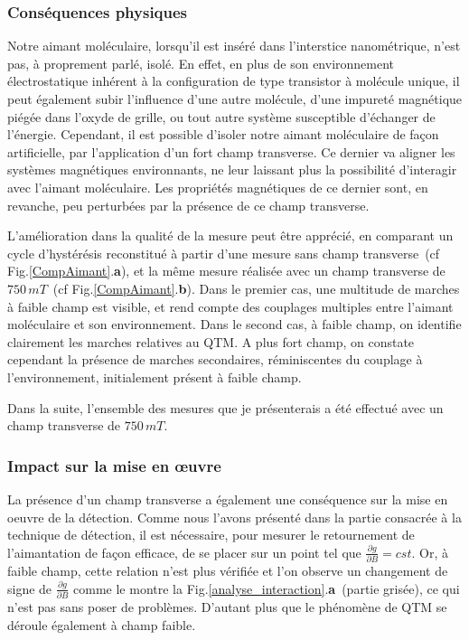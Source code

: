 \subsubsection{Conséquences physiques}
Notre aimant moléculaire, lorsqu'il est inséré dans l'interstice nanométrique, n'est pas, à proprement parlé, isolé. En effet, en plus de son environnement électrostatique inhérent à la configuration de type transistor à molécule unique, il peut également subir l'influence d'une autre molécule, d'une impureté magnétique piégée dans l'oxyde de grille, ou tout autre système susceptible d'échanger de l'énergie. Cependant, il est possible d'isoler notre aimant moléculaire de façon artificielle, par l'application d'un fort champ transverse. Ce dernier va aligner les systèmes magnétiques environnants, ne leur laissant plus la possibilité d'interagir avec l'aimant moléculaire. Les propriétés magnétiques de ce dernier sont, en revanche, peu perturbées par la présence de ce champ transverse.

L'amélioration dans la qualité de la mesure peut être apprécié, en comparant un cycle d'hystérésis reconstitué à partir d'une mesure sans champ transverse~(cf Fig.\ref{CompAimant}.\textbf{a}), et la même mesure réalisée avec un champ transverse de $750\,mT$~(cf Fig.\ref{CompAimant}.\textbf{b}). Dans le premier cas, une multitude de marches à faible champ est visible, et rend compte des couplages multiples entre l'aimant moléculaire et son environnement. Dans le second cas, à faible champ, on identifie clairement les marches relatives au QTM. A plus fort champ, on constate cependant la présence de marches secondaires, réminiscentes du couplage à l'environnement, initialement présent à faible champ.

Dans la suite, l'ensemble des mesures que je présenterais a été effectué avec un champ transverse de $750\,mT$.

\subsubsection{Impact sur la mise en œuvre}

La présence d'un champ transverse a également une conséquence sur la mise en oeuvre de la détection. Comme nous l'avons présenté dans la partie consacrée à la technique de détection, il est nécessaire, pour mesurer le retournement de l'aimantation de façon efficace, de se placer sur un point tel que $\frac{\partial g}{\partial B} = cst$. Or, à faible champ, cette relation n'est plus vérifiée et l'on observe un changement de signe de $\frac{\partial g}{\partial B}$  comme le montre la Fig.\ref{analyse_interaction}.\textbf{a}~(partie grisée), ce qui n'est pas sans poser de problèmes. D'autant plus que le phénomène de QTM se déroule également à champ faible.

